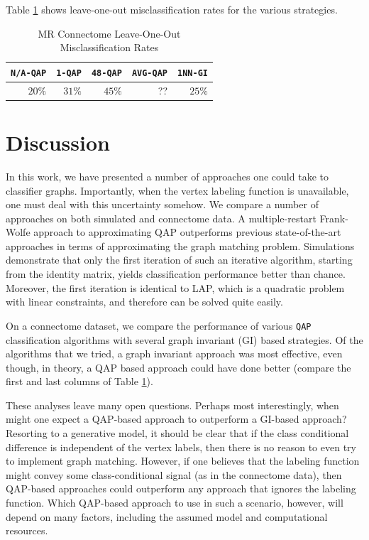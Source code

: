 \documentclass{article} %
\newcommand{\qap}{\texttt{QAP} }
\begin{document}
Table \ref{tab:connectome} shows leave-one-out misclassification rates for the various strategies.


\begin{table}[h!]
\caption{MR Connectome Leave-One-Out Misclassification Rates}
\begin{center}
\begin{tabular}{|r|r|r|r|r|}
\hline
\texttt{N/A-QAP} & \texttt{1-QAP} & \texttt{48-QAP} & \texttt{AVG-QAP} & \texttt{1NN-GI}\\
\hline
$20\%$ & $31\%$ & $45\%$ & ?? & $25\%$ \\
    \hline
\end{tabular}
\end{center}
\label{tab:connectome}
\end{table}%


\section{Discussion}


In this work, we have presented a number of approaches one could take to classifier graphs.  Importantly, when the vertex labeling function is unavailable, one must deal with this uncertainty somehow.  We compare a number of approaches on both simulated and connectome data.  A multiple-restart Frank-Wolfe approach to approximating QAP outperforms previous state-of-the-art approaches in terms of approximating the graph matching problem.  Simulations demonstrate that only the first iteration of such an iterative algorithm, starting from the identity matrix, yields classification performance better than chance.  Moreover, the first iteration is identical to LAP, which is a quadratic problem with linear constraints, and therefore can be solved quite easily.  

On a connectome dataset, we compare the performance of various \qap classification algorithms with several graph invariant (GI) based strategies.  Of the algorithms that we tried, a graph invariant approach was most effective, even though, in theory, a QAP based approach could have done better (compare the first and last columns of Table \ref{tab:connectome}).  

These analyses leave many open questions.  Perhaps most interestingly, when might one expect a QAP-based approach to outperform a GI-based approach?  Resorting to a generative model, it should be clear that if the class conditional difference is independent of the vertex labels, then there is no reason to even try to implement graph matching.  However, if one believes that the labeling function might convey some class-conditional signal (as in the connectome data), then QAP-based approaches could outperform any approach that ignores the labeling function.  Which QAP-based approach to use in such a scenario, however, will depend on many factors, including the assumed model and computational resources.
\end{document}
